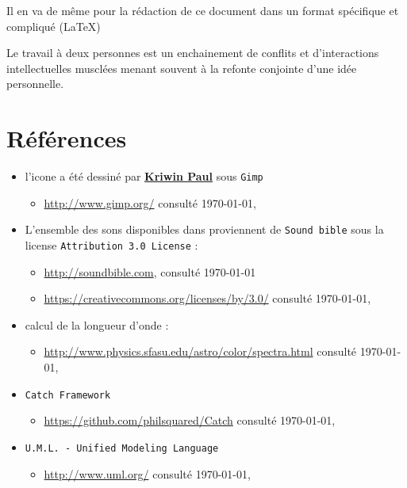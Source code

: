 \documentclass[a4paper,11pt]{report}
\begin{document}
Il en va de même pour la rédaction de ce document dans un format spécifique et
compliqué (\LaTeX)

Le travail à deux personnes est un enchainement de conflits et d'interactions intellectuelles musclées menant
souvent à la refonte conjointe d'une idée personnelle.
\chapter{Références}\label{ref}

\begin{itemize}
	\item[] l'icone a été dessiné par \href{mailto:39171@heb.be}{\textbf{Kriwin Paul}} sous
		\texttt{Gimp}
		\begin{itemize}
			\item \url{http://www.gimp.org/} consulté \today, \\
		\end{itemize}
	\item[] L'ensemble des sons disponibles dans 
		proviennent de \texttt{Sound bible}  sous la license 
		\texttt{Attribution 3.0 License} :
		\begin{itemize}
			\item \url{http://soundbible.com}, consulté \today
			\item \url{https://creativecommons.org/licenses/by/3.0/} consulté
				\today,\\
		\end{itemize}
	\item[] calcul de la longueur d'onde :
		\begin{itemize}
			\item \url{http://www.physics.sfasu.edu/astro/color/spectra.html}
				consulté \today, \\
		\end{itemize}
	\item[] \texttt{Catch Framework} 
		\begin{itemize}
			\item \url{https://github.com/philsquared/Catch} consulté \today,\\
		\end{itemize}
	\item[] \texttt{U.M.L. - Unified Modeling Language} 
		\begin{itemize}
			\item \url{http://www.uml.org/} consulté \today,\\
		\end{itemize}

\end{itemize}
\end{document}
